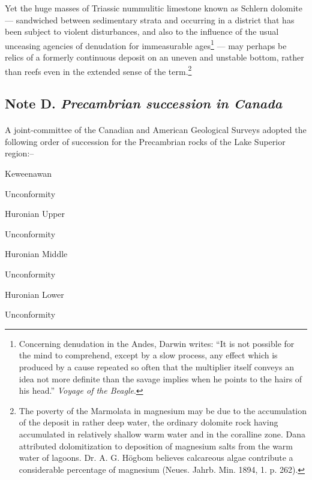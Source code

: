 \documentclass[a4paper, 12pt, oneside]{article}
\begin{document}
Yet the huge masses of Triassic nummulitic limestone known as Schlern dolomite --- sandwiched between sedimentary strata and occurring in a district that has been subject to violent disturbances, and also to the influence of the usual unceasing agencies of denudation for immeasurable ages\footnote{Concerning denudation in the Andes, Darwin writes: ``It is not possible for the mind to comprehend, except by a slow process, any effect which is produced by a cause repeated so often that the multiplier itself conveys an idea not more definite than the savage implies when he points to the hairs of his head.'' \emph{Voyage of the Beagle}.} --- may perhaps be relics of a formerly continuous deposit on an uneven and unstable bottom, rather than reefs even in the extended sense of the term.\footnote{The poverty of the Marmolata in magnesium may be due to the accumulation of the deposit in rather deep water, the ordinary dolomite rock having accumulated in relatively shallow warm water and in the coralline zone. Dana attributed dolomitization to deposition of magnesium salts from the warm water of lagoons. Dr. A. G. Högbom believes calcareous algae contribute a considerable percentage of magnesium (Neues. Jahrb. Min. 1894, 1. p. 262).}

\subsection{Note D. \emph{Precambrian succession in Canada}}
\paragraph{}
A joint-committee of the Canadian and American Geological Surveys adopted the following order of succession for the Precambrian rocks of the Lake Superior region:--

Keweenawan

\hspace{10mm}Unconformity

Huronian Upper

\hspace{10mm}Unconformity

Huronian Middle

\hspace{10mm}Unconformity

Huronian Lower

\hspace{10mm}Unconformity
\end{document}
